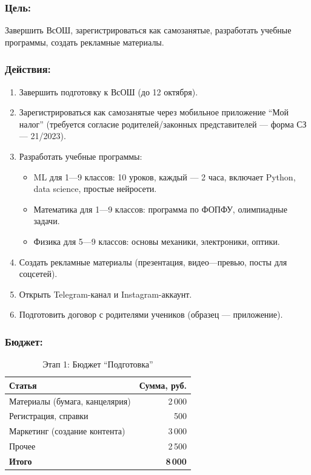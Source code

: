 \documentclass[12pt,a4paper]{article}
\begin{document}
\subsubsection*{Цель:}
Завершить ВсОШ, зарегистрироваться как самозанятые, разработать учебные программы, создать рекламные материалы.

\subsubsection*{Действия:}
\begin{enumerate}[label=\arabic*.]
  \item Завершить подготовку к ВсОШ (до 12 октября).
  \item Зарегистрироваться как самозанятые через мобильное приложение ``Мой налог'' (требуется согласие родителей/законных представителей --- форма СЗ --- 21/2023).
  \item Разработать учебные программы:
    \begin{itemize}
      \item ML для 1---9 классов: 10 уроков, каждый --- 2 часа, включает Python, data science, простые нейросети.
      \item Математика для 1---9 классов: программа по ФОПФУ, олимпиадные задачи.
      \item Физика для 5---9 классов: основы механики, электроники, оптики.
    \end{itemize}
  \item Создать рекламные материалы (презентация, видео---превью, посты для соцсетей).
  \item Открыть Telegram-канал и Instagram-аккаунт.
  \item Подготовить договор с родителями учеников (образец --- приложение).
\end{enumerate}

\subsubsection*{Бюджет:}
\begin{table}[H]
\centering
\caption{Этап 1: Бюджет ``Подготовка''}
\begin{tabular}{lr}
\toprule
Статья & Сумма, руб. \\
\midrule
Материалы (бумага, канцелярия) & 2\,000 \\
Регистрация, справки & 500 \\
Маркетинг (создание контента) & 3\,000 \\
Прочее & 2\,500 \\
\midrule
\textbf{Итого} & \textbf{8\,000} \\
\bottomrule
\end{tabular}
\end{table}
\end{document}

